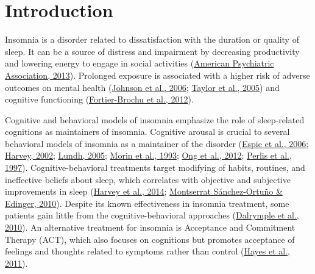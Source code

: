 \documentclass[
  ,doc,11pt, twoside,floatsintext]{apa6}
\begin{document}
\newpage

\hypertarget{introduction}{%
\section{Introduction}\label{introduction}}

Insomnia is a disorder related to dissatisfaction with the duration or quality of sleep. It can be a source of distress and impairment by decreasing productivity and lowering energy to engage in social activities (\protect\hyperlink{ref-americanpsychiatricassociation2013}{American Psychiatric Association, 2013}). Prolonged exposure is associated with a higher risk of adverse outcomes on mental health (\protect\hyperlink{ref-johnson2006}{Johnson et al., 2006}; \protect\hyperlink{ref-taylor2005}{Taylor et al., 2005}) and cognitive functioning (\protect\hyperlink{ref-fortier-brochu2012}{Fortier-Brochu et al., 2012}).

Cognitive and behavioral models of insomnia emphasize the role of sleep-related cognitions as maintainers of insomnia. Cognitive arousal is crucial to several behavioral models of insomnia as a maintainer of the disorder (\protect\hyperlink{ref-espie2006}{Espie et al., 2006}; \protect\hyperlink{ref-harvey2002}{Harvey, 2002}; \protect\hyperlink{ref-lundh2005}{Lundh, 2005}; \protect\hyperlink{ref-morin1993}{Morin et al., 1993}; \protect\hyperlink{ref-ong2012}{Ong et al., 2012}; \protect\hyperlink{ref-perlis1997}{Perlis et al., 1997}). Cognitive-behavioral treatments target modifying of habits, routines, and ineffective beliefs about sleep, which correlates with objective and subjective improvements in sleep (\protect\hyperlink{ref-harvey2014}{Harvey et al., 2014}; \protect\hyperlink{ref-montserratsanchez-ortuno2010}{Montserrat Sánchez-Ortuño \& Edinger, 2010}). Despite its known effectiveness in insomnia treatment, some patients gain little from the cognitive-behavioral approaches (\protect\hyperlink{ref-dalrymple2010}{Dalrymple et al., 2010}). An alternative treatment for insomnia is Acceptance and Commitment Therapy (ACT), which also focuses on cognitions but promotes acceptance of feelings and thoughts related to symptoms rather than control (\protect\hyperlink{ref-hayes2011acceptance}{Hayes et al., 2011}).
\end{document}
